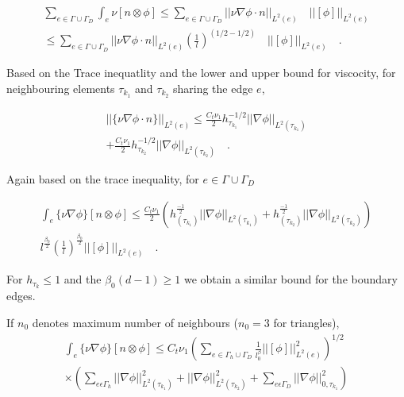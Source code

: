 \documentclass[a4paper,openany]{book}
\begin{document}
\begin{equation}
\begin{split}
\sum_{e \in \Gamma \cup \Gamma_D} \int_e {\nu}[n \otimes \phi] \leq \sum_{e \in \Gamma \cup \Gamma_D} ||\nu \nabla \phi \cdot n||_{L^2(e)} \quad ||[\phi]||_{L^2(e)} \\ \leq \sum_{e \in \Gamma \cup \Gamma_D} ||\nu \nabla \phi \cdot n||_{L^2(e)} (\frac{1}{l})^{(1/2-1/2)} \quad ||[\phi]||_{L^2(e)} \quad \textrm{.}
\end{split}
\end{equation}

Based on the Trace inequatlity and the lower and upper bound for viscocity, for neighbouring elements $\tau_{k_1}$ and $\tau_{k_2}$ sharing the edge $e$, 

\begin{equation}
\begin{split}
||\lbrace \nu \nabla \phi \cdot n \rbrace||_{L^2(e)} \leq \frac{C_t \nu_1}{2} {h_{\tau_{k_1}}^{-1/2}} ||\nabla \phi||_{L^2({\tau_{k_1}})} \\ + \frac{C_t \nu_1}{2} {h_{{\tau_{k_2}}}^{-1/2}} ||\nabla \phi||_{L^2({\tau_{k_2}})} \quad \textrm{.}
\end{split}
\end{equation}

Again based on the trace inequality, for $e \in \Gamma \cup \Gamma_D$

\begin{equation}
\begin{split}
\int_e \lbrace \nu \nabla \phi \rbrace [n \otimes \phi] \leq \frac{C_t \nu_1}{2}  \left( h_{(\tau_{k_1})}^{\frac{-1}{2}} ||\nabla \phi||_{L^2{(\tau_{k_1})}} + {h_{(\tau_{k_2})}^{\frac{-1}{2}}} ||\nabla \phi||_{L^2{(\tau_{k_2})}} \right) \\ l^{\frac{\beta_0}{2}} \left({\frac{1}{l}}\right)^{\frac{\beta_0}{2}} ||[\phi]||_{L^2(e)} \quad \textrm{.}
\end{split}
\end{equation}

For $h_{\tau_k} \leq 1$ and the $\beta_0 (d-1) \geq 1$ we obtain a similar bound for the boundary edges.

If $n_0$ denotes maximum number of neighbours ($n_0 = 3$ for triangles),
\begin{equation}
\begin{split}
\int_e \lbrace \nu \nabla \phi \rbrace[n \otimes \phi] \leq C_t \nu_1 \left( \sum_{e \in \Gamma_h \cup \Gamma_D} \frac{1}{l^\beta_0} ||[\phi]||^2_{L^2(e)} \right)^{1/2} \\ \times \left( \sum_{e \epsilon \Gamma_h} ||\nabla \phi||^2_{L^2(\tau_{k_1})} + ||\nabla \phi||^2_{L^2(\tau_{k_2})} + \sum_{e \epsilon \Gamma_D} ||\nabla \phi||^2_{0,\tau_{k_1}} \right)
\end{split}
\end{equation}
\end{document}
